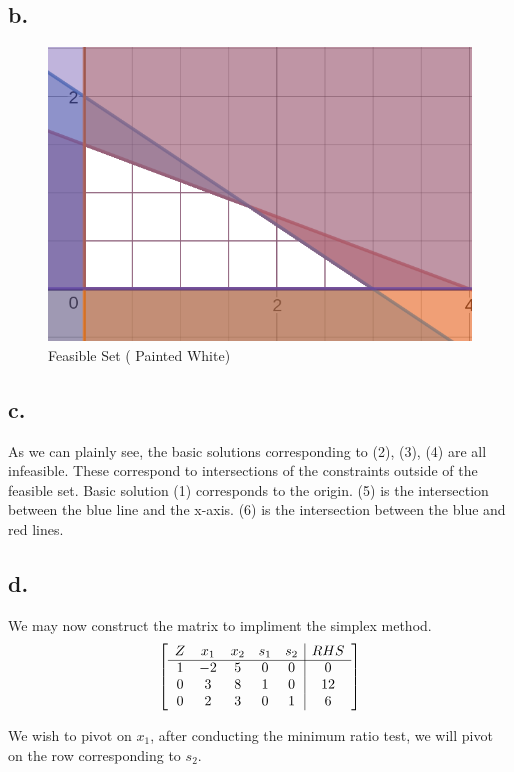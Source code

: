 \documentclass[10pt, letterpaper]{paper}
\begin{document}
\subsection*{b.}
\begin{figure}[H]
\centering\includegraphics[width=.8\textwidth]{graph2.png}
\caption{Feasible Set ( Painted White) }
\end{figure}

\subsection*{c.}
As we can plainly see, the basic solutions corresponding to (2), (3), (4) are all infeasible. These correspond to intersections of the constraints outside of the feasible set.
Basic solution (1) corresponds to the origin. (5) is the intersection between the blue line and the x-axis. (6) is the intersection between the blue and red lines.

\subsection*{d.}

We may now construct the matrix to impliment the simplex method.
\[
	\left[ {\begin{array}{ccccc|c}
	Z & x_1 & x_2 & s_1 & s_2 & RHS\\ \cline{1-6}
	1 & -2 & 5 & 0 & 0 & 0 \\
	0 & 3 & 8 & 1 & 0 & 12 \\
	0 & 2 & 3 & 0 & 1 & 6 \\
	\end{array} } \right]
\]

We wish to pivot on $x_1$, after conducting the minimum ratio test, we will pivot on the row corresponding to $s_2$.
\end{document}
